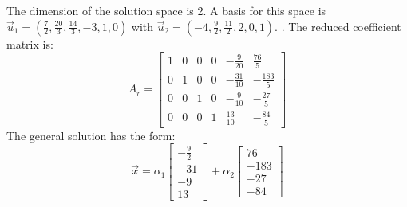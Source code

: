 \documentclass[11pt]{homework}
\begin{document}
The dimension of the solution space is 2.
A basis for this space is
$\vec u_1 = ( \frac{7}{2} , \frac{20}{3} , \frac{14}{3} , -3, 1 , 0)$ 
with 
$\vec u_2 = ( -4 , \frac{9}{2} , \frac{11}{2} , 2 , 0 , 1)$.
\newline
{}. The reduced coefficient matrix is:
\begin{equation*}
A_r = 
  \begin{bmatrix}
  1 & 0 & 0 & 0 & -\frac{9}{20} & \frac{76}{5} \\
  0 & 1 & 0 & 0 & -\frac{31}{10} & -\frac{183}{5} \\
  0 & 0 & 1 & 0 & -\frac{9}{10} & -\frac{27}{5} \\
  0 & 0 & 0 & 1 & \frac{13}{10} & -\frac{84}{5} 
  \end{bmatrix}
\end{equation*}
The general solution has the form:
\begin{equation*}
\vec x =
  \alpha_1 
  \begin{bmatrix}
  -\frac{9}{2} \\
  -31 \\
  -9 \\
  13 
  \end{bmatrix}
  + \alpha_2
  \begin{bmatrix}
  76 \\
  -183 \\
  -27 \\
  -84 
  \end{bmatrix}
\end{equation*}
\end{document}
